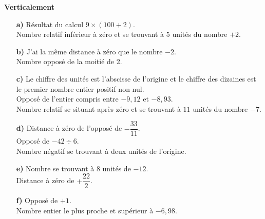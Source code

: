 \begin{enigme}
\begin{multicols}{2}
        {\bf Verticalement} \\
        \begin{enumerate}
        \item[\textcolor{B1}{\bf a)}] Résultat du calcul $9\times(100+2)$. \\
            Nombre relatif inférieur à zéro et se trouvant à 5 unités du nombre $+2$. \\
        \item[\textcolor{B1}{\bf b)}] J'ai la même distance à zéro que le nombre $-2$. \\
            Nombre opposé de la moitié de 2. \\
        \item[\textcolor{B1}{\bf c)}] Le chiffre des unités est l'abscisse de l'origine et le chiffre des dizaines est le premier nombre entier positif non nul. \\
            Opposé de l'entier compris entre $-9,12$ et $-8,93$. \\
            Nombre relatif se situant après zéro et se trouvant à $11$ unités du nombre $-7$. \\
        \item[\textcolor{B1}{\bf d)}] Distance à zéro de l'opposé de $-\dfrac{33}{11}$. \\ [1mm]
            Opposé de $-42\div6$. \\
            Nombre négatif se trouvant à deux unités de l'origine. \\
        \item[\textcolor{B1}{\bf e)}] Nombre se trouvant à 8 unités de $-12$. \\ [1mm]
            Distance à zéro de $+\dfrac{22}{2}$. \\
        \item[\textcolor{B1}{\bf f)}] Opposé de $+1$. \\
            Nombre entier le plus proche et supérieur à $-6,98$.
        \end{enumerate}
    \end{multicols}
 \end{enigme}
 

